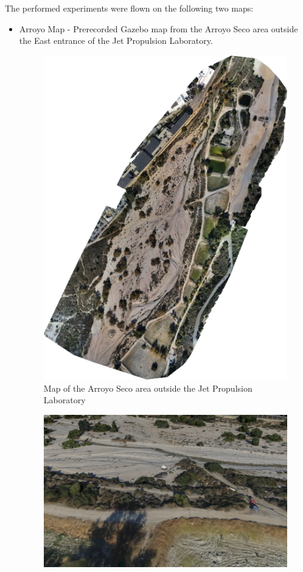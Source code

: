 The performed experiments were flown on the following two maps:
\begin{itemize}
    \item Arroyo Map - Prerecorded Gazebo map from the Arroyo Seco area outside the East entrance of the Jet Propulsion Laboratory.
    \begin{figure}[h]
        \centering
        \includegraphics[scale=0.5]{images/evaluation/arroyo.png}
        \caption{Map of the Arroyo Seco area outside the Jet Propulsion Laboratory}
    \end{figure}
    \begin{figure}[h]
        \centering
        \includegraphics[scale=0.23]{images/evaluation/arroyo_map.png}

\end{figure}
\end{itemize}
